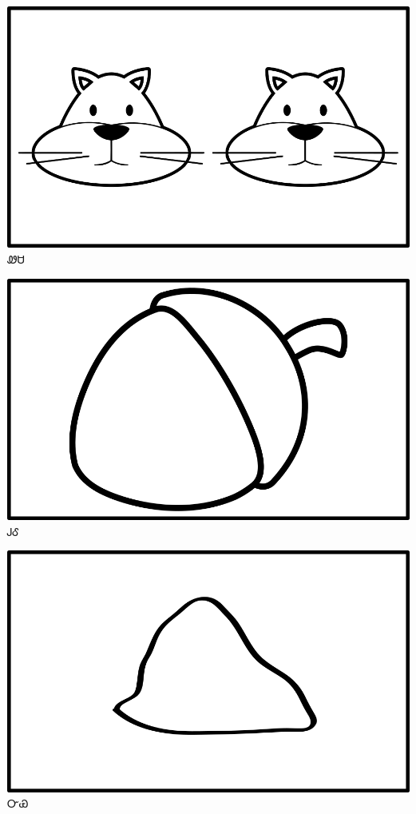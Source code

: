\documentclass[avery5371]{flashcards}%
\begin{document}
\begin{flashcard}{
\includegraphics[width=0.95\columnwidth,height=.51\columnwidth,keepaspectratio]{../artwork/objects-animate/anitali-wesa}
}\Huge ᏪᏌ
\end{flashcard}

\begin{flashcard}{
\includegraphics[width=0.95\columnwidth,height=.51\columnwidth,keepaspectratio]{../artwork/objects-neutral/gule}
}\Huge ᎫᎴ
\end{flashcard}

\begin{flashcard}{
\includegraphics[width=0.95\columnwidth,height=.51\columnwidth,keepaspectratio]{../artwork/objects-neutral/nvya}
}\Huge ᏅᏯ
\end{flashcard}
\end{document}
